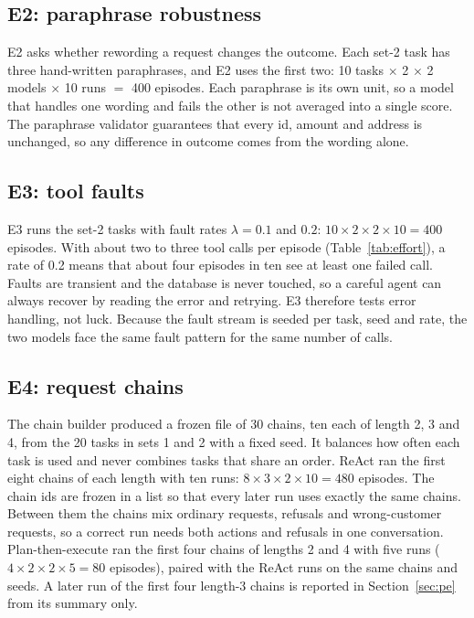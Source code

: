 \documentclass[10pt,a4paper,twocolumn]{article}
\begin{document}
\subsection{E2: paraphrase robustness}
E2 asks whether rewording a request changes the outcome. Each set-2 task has three hand-written paraphrases, and E2 uses
the first two: 10 tasks $\times$ 2 $\times$ 2 models $\times$ 10 runs $=$ 400 episodes. Each paraphrase is its own unit,
so a model that handles one wording and fails the other is not averaged into a single score. The paraphrase validator
guarantees that every id, amount and address is unchanged, so any difference in outcome comes from the wording alone.

\subsection{E3: tool faults}
E3 runs the set-2 tasks with fault rates $\lambda=0.1$ and $0.2$: $10\times2\times2\times10=400$ episodes. With about
two to three tool calls per episode (Table~\ref{tab:effort}), a rate of 0.2 means that about four episodes in ten see at
least one failed call. Faults are transient and the database is never touched, so a careful agent can always recover by
reading the error and retrying. E3 therefore tests error handling, not luck. Because the fault stream is seeded per
task, seed and rate, the two models face the same fault pattern for the same number of calls.

\subsection{E4: request chains}
The chain builder produced a frozen file of 30 chains, ten each of length 2, 3 and 4, from the 20 tasks in sets 1 and 2
with a fixed seed. It balances how often each task is used and never combines tasks that share an order. ReAct ran the
first eight chains of each length with ten runs: $8\times3\times2\times10=480$ episodes. The chain ids are frozen in a
list so that every later run uses exactly the same chains. Between them the chains mix ordinary requests, refusals and
wrong-customer requests, so a correct run needs both actions and refusals in one conversation. Plan-then-execute ran the
first four chains of lengths 2 and 4 with five runs ($4\times2\times2\times5=80$ episodes), paired with the ReAct runs on
the same chains and seeds. A later run of the first four length-3 chains is reported in Section~\ref{sec:pe} from its
summary only.
\end{document}
